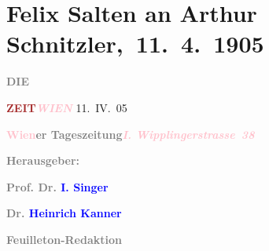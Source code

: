 

\renewcommand{\erwaehntePersonen}{Personen: Berta Czegka, Heinrich Kanner, Olga Schnitzler, Isidor Singer}
\renewcommand{\erwaehnteInstitutionen}{Institutionen: Die Zeit}
\renewcommand{\erwaehnteOrte}{Orte: Wien, Wipplingerstraße}
\renewcommand{\erwaehnteWerke}{Werke: Schiller-Feier, Schiller-Zeit 1805 * 1905, Zum großen Wurstel. Burleske in einem Akt}
\section[ Felix Salten an Arthur Schnitzler, 11. 4. 1905]{Felix Salten an Arthur Schnitzler, 11. 4. 1905}
\nopagebreak{}
\rehead{ }\normalsize\beginnumbering{}
\toendnotes[C]{\smallbreak\pagebreak[2]}
\toendnotes[C]{\smallbreak}
\pstart
           \noindent{}{\pb}\textcolor{gray}{\textbf{DIE}}\pend
           
\pstart
           \textcolor{gray}{\textbf{\textcolor{brown}{ZEIT}{}\ledrightnote{\textcolor{brown}{Die Zeit}}}}\hfill \textcolor{gray}{\textbf{\emph{\textcolor{pink}{WIEN}{}\ledrightnote{\textcolor{pink}{Wien}}}}}{ }11. IV. 05\pend
           
\pstart
           \textcolor{gray}{\textbf{\textcolor{pink}{Wien}{}\ledrightnote{\textcolor{pink}{Wien}}er Tageszeitung}}\hfill \textcolor{gray}{\textbf{\emph{\textcolor{pink}{I. Wipplingerstrasse 38}{}\ledrightnote{\textcolor{pink}{Wipplingerstraße}}}}}\pend
           
\pstart
           \textcolor{gray}{\textbf{Herausgeber:}}\pend
           
\pstart
           \textcolor{gray}{\textbf{\textbf{Prof. Dr. \textcolor{blue}{I. Singer}{}\ledrightnote{\textcolor{blue}{Isidor Singer}}}}}\pend
           
\pstart
           \textcolor{gray}{\textbf{\textbf{Dr. \textcolor{blue}{Heinrich Kanner}{}\ledrightnote{\textcolor{blue}{Heinrich Kanner}}}}}\pend
           
\pstart
           \textcolor{gray}{\textbf{\textbf{Feuilleton-Redaktion}}}\pend
           
